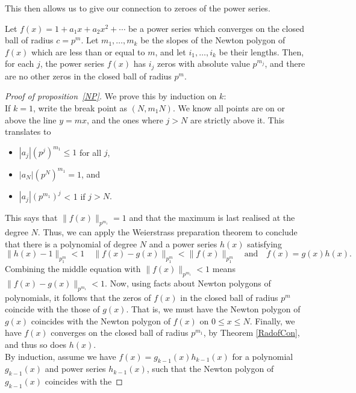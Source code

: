 This then allows us to give our connection to zeroes of the power series.

\begin{corollary}
    Let $f(x) = 1 + a_1 x + a_2 x^2 + \cdots$ be a power series which converges on the closed ball
    of radius $c = p^m$. Let $m_1,\dots, m_k$ be the slopes of the Newton polygon of $f(x)$ which
    are less than or equal to $m$, and let $i_1,\dots,i_k$ be their lengths. Then, for each $j$, the
    power series $f(x)$ has $i_j$ zeros with absolute value $p^{m_j}$, and there are no other zeros
    in the closed ball of radius $p^m.$
\end{corollary}

\begin{proof}[Proof of proposition~\ref{NP}]
    We prove this by induction on $k$:\\
    If $k=1$, write the break point as $(N, m_1 N)$. We know all points are on or above the line
    $y = m x$, and the ones where $j > N$ are strictly above it. This translates to
    \begin{itemize}
        \item $| a_j | (p^j)^{m_1} \leq 1$ for all $j$,
        \item $| a_N | (p^N)^{m_1} = 1$, and
        \item $| a_j | (p^{m_1})^j$ < 1 if $j > N.$
    \end{itemize}
    This says that $\|f(x) \|_{p^{m_1}} = 1$ and that the maximum is last realised at the degree
    $N$. Thus, we can apply the Weierstrass preparation theorem to conclude that there is a
    polynomial of degree $N$ and a power series $h(x)$ satisfying
    \[
    \| h(x) - 1 \|_{p^m_1} < 1 \quad \|f(x) - g(x)\|_{p^m_1} < \|f(x) \|_{p^m_1} \quad \text{and} \quad f(x) = g(x) h(x).
    \]
    Combining the middle equation with $\| f(x) \|_{p^{m_1}} < 1$ means
    $\| f(x) - g(x) \|_{p^{m_1}} < 1$.
    Now, using facts about Newton polygons of polynomials, it follows that the zeros of $f(x)$ in
    the closed ball of radius $p^m$ coincide with the those of $g(x)$. That is, we must have the
    Newton polygon of $g(x)$ coincides with the Newton polygon of $f(x)$ on $0 \leq x \leq N$.
    Finally, we have $f(x)$ converges on the closed ball of radius $p^{m_1}$, by Theorem
    \ref{RadofCon}, and thus so does $h(x).$
    \\
    By induction, assume we have $f(x) = g_{k-1}(x)h_{k-1}(x)$ for a polynomial $g_{k-1}(x)$ and
    power series $h_{k-1}(x)$, such that the Newton polygon of $g_{k-1}(x)$ coincides with the

\end{proof}
